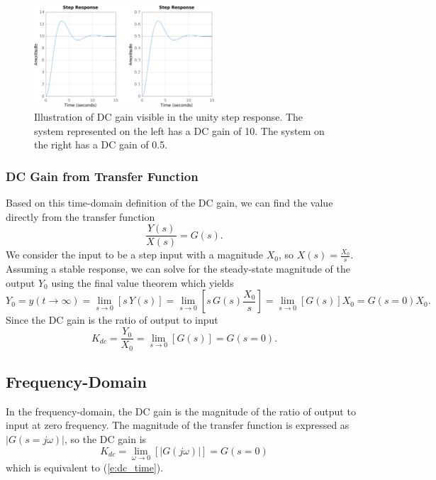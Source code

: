 \documentclass[11pt]{article}
\begin{document}
\begin{figure}[hb!]
\centering  
\includegraphics [width=0.6\textwidth]{step_gain.png}
\caption{Illustration of DC gain visible in the unity step response.  The system represented on the left has a DC gain of 10.  The system on the right has a DC gain of 0.5.}
\label{f:step}
\end{figure}

\subsubsection{DC Gain from Transfer Function}

Based on this time-domain definition of the DC gain, we can find the value directly from the transfer function
\[
\frac{Y(s)}{X(s)} = G(s).
\]
We consider the input to be a step input with a magnitude $X_0$, so $X(s) = \frac{X_0}{s}$.  Assuming a stable response, we can solve for the steady-state magnitude of the output $Y_0$ using the final value theorem which yields
\[
Y_0 = y(t \to \infty) = \lim_{s \to 0} \left[ s \, Y(s) \right]=  \lim_{s \to 0}  \left[ s \, G(s) \frac{X_0}{s} \right] =  \lim_{s \to 0} \left[ G(s) \right] X_0 = G(s=0) X_0.
\]
Since the DC gain is the ratio of output to input
\begin{equation}
  K_{dc} = \frac{Y_0}{X_0}  = \lim_{s \to 0} \left[ G(s) \right] = G(s=0).
  \label{e:dc_time}
\end{equation}

\subsection{Frequency-Domain}
In the frequency-domain, the DC gain is the magnitude of the ratio of output to input at zero frequency.  The magnitude of the transfer function is expressed as $|G(s=j\omega)|$, so the DC gain is
\begin{equation}
K_{dc}= \lim_{\omega \to 0} \left[ | G(j \omega) | \right] = G(s=0)
\end{equation}
which is equivalent to (\ref{e:dc_time}).
\end{document}
